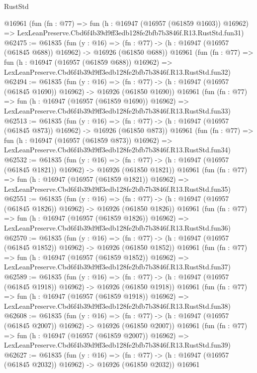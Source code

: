 \begin{lexlean}{RustStd}
\begin{coremodule}
    @16961
    (fun (fn : @77) =>
    fun (h : @16947 (@16957 (@61859 @1603)) @16962) =>
    LexLeanPreserve.Cbd6f4b39d9ff3edb128fe2bfb7b3846f.R13.RustStd.fun31)
@62475 := @61835
    (fun (y : @16) =>
    (fn : @77) -> (h : @16947 (@16957 (@61845 @688)) @16962) -> @16926 (@61850 @688))
    @16961
    (fun (fn : @77) =>
    fun (h : @16947 (@16957 (@61859 @688)) @16962) =>
    LexLeanPreserve.Cbd6f4b39d9ff3edb128fe2bfb7b3846f.R13.RustStd.fun32)
@62494 := @61835
    (fun (y : @16) =>
    (fn : @77) -> (h : @16947 (@16957 (@61845 @1690)) @16962) -> @16926 (@61850 @1690))
    @16961
    (fun (fn : @77) =>
    fun (h : @16947 (@16957 (@61859 @1690)) @16962) =>
    LexLeanPreserve.Cbd6f4b39d9ff3edb128fe2bfb7b3846f.R13.RustStd.fun33)
@62513 := @61835
    (fun (y : @16) =>
    (fn : @77) -> (h : @16947 (@16957 (@61845 @873)) @16962) -> @16926 (@61850 @873))
    @16961
    (fun (fn : @77) =>
    fun (h : @16947 (@16957 (@61859 @873)) @16962) =>
    LexLeanPreserve.Cbd6f4b39d9ff3edb128fe2bfb7b3846f.R13.RustStd.fun34)
@62532 := @61835
    (fun (y : @16) =>
    (fn : @77) -> (h : @16947 (@16957 (@61845 @1821)) @16962) -> @16926 (@61850 @1821))
    @16961
    (fun (fn : @77) =>
    fun (h : @16947 (@16957 (@61859 @1821)) @16962) =>
    LexLeanPreserve.Cbd6f4b39d9ff3edb128fe2bfb7b3846f.R13.RustStd.fun35)
@62551 := @61835
    (fun (y : @16) =>
    (fn : @77) -> (h : @16947 (@16957 (@61845 @1826)) @16962) -> @16926 (@61850 @1826))
    @16961
    (fun (fn : @77) =>
    fun (h : @16947 (@16957 (@61859 @1826)) @16962) =>
    LexLeanPreserve.Cbd6f4b39d9ff3edb128fe2bfb7b3846f.R13.RustStd.fun36)
@62570 := @61835
    (fun (y : @16) =>
    (fn : @77) -> (h : @16947 (@16957 (@61845 @1852)) @16962) -> @16926 (@61850 @1852))
    @16961
    (fun (fn : @77) =>
    fun (h : @16947 (@16957 (@61859 @1852)) @16962) =>
    LexLeanPreserve.Cbd6f4b39d9ff3edb128fe2bfb7b3846f.R13.RustStd.fun37)
@62589 := @61835
    (fun (y : @16) =>
    (fn : @77) -> (h : @16947 (@16957 (@61845 @1918)) @16962) -> @16926 (@61850 @1918))
    @16961
    (fun (fn : @77) =>
    fun (h : @16947 (@16957 (@61859 @1918)) @16962) =>
    LexLeanPreserve.Cbd6f4b39d9ff3edb128fe2bfb7b3846f.R13.RustStd.fun38)
@62608 := @61835
    (fun (y : @16) =>
    (fn : @77) -> (h : @16947 (@16957 (@61845 @2007)) @16962) -> @16926 (@61850 @2007))
    @16961
    (fun (fn : @77) =>
    fun (h : @16947 (@16957 (@61859 @2007)) @16962) =>
    LexLeanPreserve.Cbd6f4b39d9ff3edb128fe2bfb7b3846f.R13.RustStd.fun39)
@62627 := @61835
    (fun (y : @16) =>
    (fn : @77) -> (h : @16947 (@16957 (@61845 @2032)) @16962) -> @16926 (@61850 @2032))
    @16961

\end{coremodule}
\end{lexlean}
